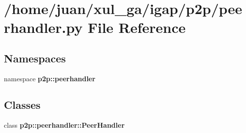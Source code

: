 \section{/home/juan/xul\_\-ga/igap/p2p/peerhandler.py File Reference}
\label{peerhandler_8py}
\subsection*{Namespaces}
\begin{CompactItemize}
\item 
namespace {\bf p2p::peerhandler}
\end{CompactItemize}
\subsection*{Classes}
\begin{CompactItemize}
\item 
class {\bf p2p::peerhandler::PeerHandler}
\end{CompactItemize}
